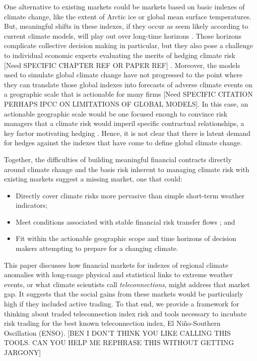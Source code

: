 \documentclass[authoryear]{article}
\begin{document}
One alternative to existing markets could be markets based on basic indexes of climate change, like the extent of Arctic ice or global mean surface temperatures. But, meaningful shifts in these indexes, if they occur as seem likely according to current climate models, will play out over long-time horizons \cite{ipcc2013fifthReport}. Those horizons complicate collective decision making in particular, but they also pose a challenge to individual economic experts evaluating the merits of hedging climate risk \cite{jacquet2013intra} \cite{nordhaus2013}[Need SPECIFIC CHAPTER REF OR PAPER REF] \cite{pindyck2013}. Moreover, the models used to simulate global climate change have not progressed to the point where they can translate those global indexes into forecasts of adverse climate events on a geographic scale that is actionable for many firms [Need SPECIFIC CITATION PERHAPS IPCC ON LIMITATIONS OF GLOBAL MODELS]. In this case, an actionable geographic scale would be one focused enough to convince risk managers that a climate risk would imperil specific contractual relationships, a key factor motivating hedging \cite{pennings2000motivation} \cite{pennings2001behavioural}. Hence, it is not clear that there is latent demand for hedges against the indexes that have come to define global climate change.

Together, the difficulties of building meaningful financial contracts directly around climate change and the basis risk inherent to managing climate risk with existing markets suggest a missing market, one that could:

\begin{itemize}
\item Directly cover climate risks more pervasive than simple short-term weather indicators;
\item Meet conditions associated with stable financial risk transfer flows \cite{working1953futures} \cite{silber1981innovation} \cite{carlton1984futures} \cite{black1986success} \cite{duffie1989optimal} \cite{tashjian1995optimal} \cite{pennings1999commodity} \cite{brorsen2001success} \cite{gorham12} \cite{sandor2012}; and
\item Fit within the actionable geographic scope and time horizons of decision makers attempting to prepare for a changing climate. 
\end{itemize}

This paper discusses how financial markets for indexes of regional climate anomalies with long-range physical and statistical links to extreme weather events, or what climate scientists call \emph{teleconnections}, might address that market gap. It suggests that the social gains from these markets would be particularly high if they included active trading. To that end, we provide a framework for thinking about traded teleconnection index risk and tools necessary to incubate risk trading for the best known teleconnection index, El Ni\~no-Southern Oscillation (ENSO). [BEN I DON'T THINK YOU LIKE CALLING THIS TOOLS. CAN YOU HELP ME REPHRASE THIS WITHOUT GETTING JARGONY] 
\end{document}
